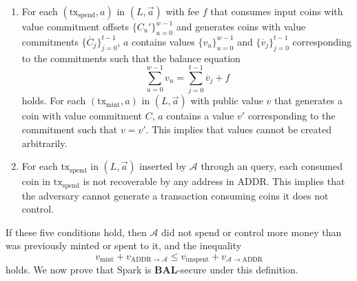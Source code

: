 \documentclass{llncs}
\begin{document}
\begin{enumerate}
    \item\label{cond:balance} For each $(\text{tx}_{\text{spend}}, a)$ in $(L, \vec{a})$ with fee $f$ that consumes input coins with value commitment offsets $\{C_u'\}_{u=0}^{w-1}$ and generates coins with value commitments $\{\overline{C}_j\}_{j=0}^{t-1}$, $a$ contains values $\{v_u\}_{u=0}^{w-1}$ and $\{\overline{v}_j\}_{j=0}^{t-1}$ corresponding to the commitments such that the balance equation
    $$\sum_{u=0}^{w-1} v_u = \sum_{j=0}^{t-1} \overline{v}_j + f$$
    holds.
    For each $(\text{tx}_{\text{mint}}, a)$ in $(L, \vec{a})$ with public value $v$ that generates a coin with value commitment $C$, $a$ contains a value $v'$ corresponding to the commitment such that $v = v'$.
    This implies that values cannot be created arbitrarily.
    
    \item\label{cond:honest} For each $\text{tx}_{\text{spend}}$ in $(L, \vec{a})$ inserted by $\mathcal{A}$ through an  query, each consumed coin in $\text{tx}_{\text{spend}}$ is not recoverable by any address in $\text{ADDR}$.
    This implies that the adversary cannot generate a transaction consuming coins it does not control.
\end{enumerate}
If these five conditions hold, then $\mathcal{A}$ did not spend or control more money than was previously minted or spent to it, and the inequality
$$v_{\text{mint}} + v_{\text{ADDR} \to \mathcal{A}} \leq v_{\text{unspent}} + v_{\mathcal{A} \to \text{ADDR}}$$
holds.
We now prove that Spark is \textbf{BAL}-secure under this definition.
\end{document}
